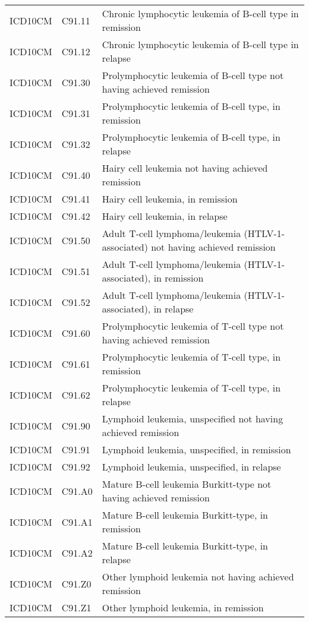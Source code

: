 \begin{longtable}{p{}p{}p{}}
  ICD10CM & C91.11 & Chronic lymphocytic leukemia of B-cell type in remission \\ 
  ICD10CM & C91.12 & Chronic lymphocytic leukemia of B-cell type in relapse \\ 
  ICD10CM & C91.30 & Prolymphocytic leukemia of B-cell type not having achieved remission \\ 
  ICD10CM & C91.31 & Prolymphocytic leukemia of B-cell type, in remission \\ 
  ICD10CM & C91.32 & Prolymphocytic leukemia of B-cell type, in relapse \\ 
  ICD10CM & C91.40 & Hairy cell leukemia not having achieved remission \\ 
  ICD10CM & C91.41 & Hairy cell leukemia, in remission \\ 
  ICD10CM & C91.42 & Hairy cell leukemia, in relapse \\ 
  ICD10CM & C91.50 & Adult T-cell lymphoma/leukemia (HTLV-1-associated) not having achieved remission \\ 
  ICD10CM & C91.51 & Adult T-cell lymphoma/leukemia (HTLV-1-associated), in remission \\ 
  ICD10CM & C91.52 & Adult T-cell lymphoma/leukemia (HTLV-1-associated), in relapse \\ 
  ICD10CM & C91.60 & Prolymphocytic leukemia of T-cell type not having achieved remission \\ 
  ICD10CM & C91.61 & Prolymphocytic leukemia of T-cell type, in remission \\ 
  ICD10CM & C91.62 & Prolymphocytic leukemia of T-cell type, in relapse \\ 
  ICD10CM & C91.90 & Lymphoid leukemia, unspecified not having achieved remission \\ 
  ICD10CM & C91.91 & Lymphoid leukemia, unspecified, in remission \\ 
  ICD10CM & C91.92 & Lymphoid leukemia, unspecified, in relapse \\ 
  ICD10CM & C91.A0 & Mature B-cell leukemia Burkitt-type not having achieved remission \\ 
  ICD10CM & C91.A1 & Mature B-cell leukemia Burkitt-type, in remission \\ 
  ICD10CM & C91.A2 & Mature B-cell leukemia Burkitt-type, in relapse \\ 
  ICD10CM & C91.Z0 & Other lymphoid leukemia not having achieved remission \\ 
  ICD10CM & C91.Z1 & Other lymphoid leukemia, in remission \\ 

\end{longtable}
